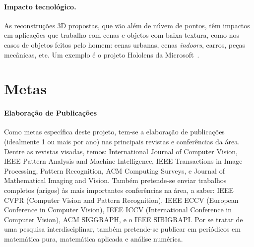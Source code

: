 \documentclass[a4paper,titlepage]{article}
\begin{document}
\paragraph{Impacto tecnológico.} 
As reconstruções 3D propostas, que vão além de núvem de pontos, têm impactos em
aplicações que trabalho com cenas e objetos com baixa textura, como nos casos de
objetos feitos pelo homem: cenas urbanas, cenas \emph{indoors}, carros, peças
mecânicas, etc. Um exemplo é o projeto Hololens da Microsoft~\cite{nurutdinova2015towards}.  


\section{Metas}
\paragraph{Elaboração de Publicações}
Como metas específica deste projeto, tem-se a elaboração de
publicações (idealmente 1 ou mais por ano) nas principais revistas e conferências da área. Dentre as
revistas visadas, temos: International
Journal of Computer Vision, IEEE Pattern Analysis and Machine Intelligence, IEEE
Transactions in Image Processing, Pattern Recognition, ACM Computing Surveys, e
Journal of Mathematical Imaging and Vision. Também pretende-se enviar trabalhos
completos (arigos) às mais importantes conferências na área, a saber: IEEE CVPR
(Computer Vision and Pattern Recognition), IEEE ECCV (European Conference in
Computer Vision), IEEE ICCV (International Conference in Computer Vision),  ACM
SIGGRAPH, e o IEEE SIBIGRAPI. Por se tratar de uma pesquisa interdisciplinar,
também pretende-se publicar em periódicos em matemática pura, matemática aplicada
e análise numérica.
\end{document}
